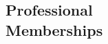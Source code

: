 \documentclass[margin,line,pifont,palatino,courier]{res}
\begin{document}
\begin{resume}










\section{\sc Professional\\ Memberships}

\begin{tabular}{@{}p{0.8in}p{4in}}


\end{tabular}
\end{resume}
\end{document}
